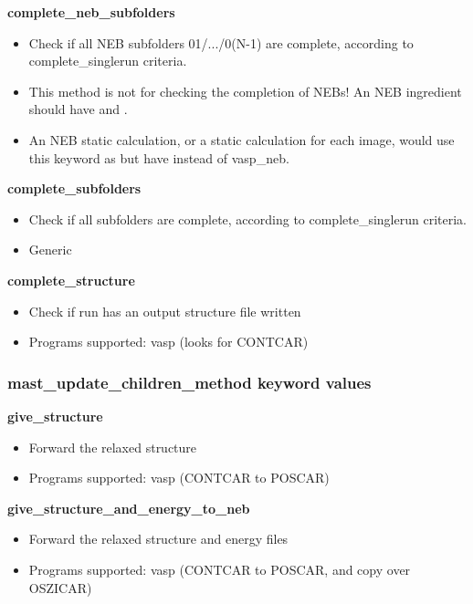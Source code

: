 \documentclass[letterpaper,10pt,english]{sphinxmanual}
\begin{document}
\textbf{complete\_neb\_subfolders}
\begin{itemize}
\item {} 
Check if all NEB subfolders 01/.../0(N-1) are complete, according to complete\_singlerun criteria.

\item {} 
This method is not for checking the completion of NEBs! An NEB ingredient should have  and .

\item {} 
An NEB static calculation, or a static calculation for each image, would use this keyword as  but have  instead of vasp\_neb.

\end{itemize}

\textbf{complete\_subfolders}
\begin{itemize}
\item {} 
Check if all subfolders are complete, according to complete\_singlerun criteria.

\item {} 
Generic

\end{itemize}

\textbf{complete\_structure}
\begin{itemize}
\item {} 
Check if run has an output structure file written

\item {} 
Programs supported: vasp (looks for CONTCAR)

\end{itemize}


\subsubsection{mast\_update\_children\_method keyword values}
\label{3_1_2_ingredients:mast-update-children-method-keyword-values}
\textbf{give\_structure}
\begin{itemize}
\item {} 
Forward the relaxed structure

\item {} 
Programs supported: vasp (CONTCAR to POSCAR)

\end{itemize}

\textbf{give\_structure\_and\_energy\_to\_neb}
\begin{itemize}
\item {} 
Forward the relaxed structure and energy files

\item {} 
Programs supported: vasp (CONTCAR to POSCAR, and copy over OSZICAR)

\end{itemize}
\end{document}
